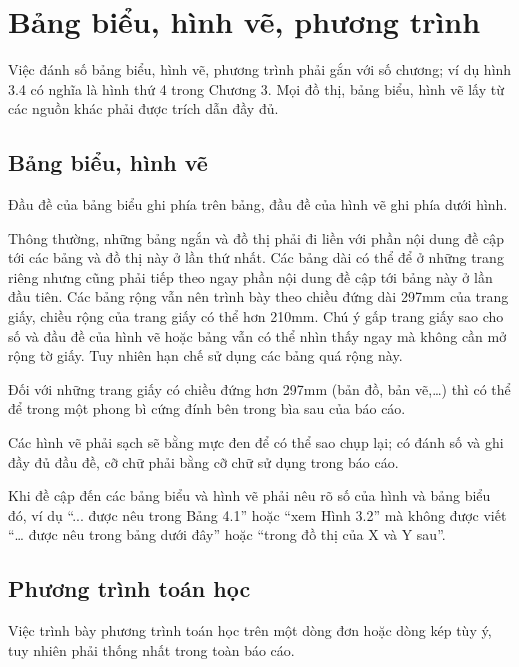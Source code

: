 \section{Bảng biểu, hình vẽ, phương trình}


Việc đánh số bảng biểu, hình vẽ, phương trình phải gắn với số chương; ví dụ hình 3.4 có nghĩa là hình thứ 4 trong Chương 3. Mọi đồ thị, bảng biểu, hình vẽ lấy từ các nguồn khác phải được trích dẫn đầy đủ.

\subsection{Bảng biểu, hình vẽ}



Đầu đề của bảng biểu ghi phía trên bảng, đầu đề của hình vẽ ghi phía dưới hình.

Thông thường, những bảng ngắn và đồ thị phải đi liền với phần nội dung đề cập tới các bảng và đồ thị này ở lần thứ nhất. Các bảng dài có thể để ở những trang riêng nhưng cũng phải tiếp theo ngay phần nội dung đề cập tới bảng này ở lần đầu tiên. Các bảng rộng vẫn nên trình bày theo chiều đứng dài 297mm của trang giấy, chiều rộng của trang giấy có thể hơn 210mm. Chú ý gấp trang giấy sao cho số và đầu đề của hình vẽ hoặc bảng vẫn có thể nhìn thấy ngay mà không cần mở rộng tờ giấy. Tuy nhiên hạn chế sử dụng các bảng quá rộng này.

Đối với những trang giấy có chiều đứng hơn 297mm (bản đồ, bản vẽ,\ldots) thì có thể để trong một phong bì cứng đính bên trong bìa sau của báo cáo.

Các hình vẽ phải sạch sẽ bằng mực đen để có thể sao chụp lại; có đánh số và ghi đầy đủ đầu đề, cỡ chữ phải bằng cỡ chữ sử dụng trong báo cáo.

Khi đề cập đến các bảng biểu và hình vẽ phải nêu rõ số của hình và bảng biểu đó, ví dụ ``... được nêu trong Bảng 4.1'' hoặc ``xem Hình 3.2'' mà không được viết ``… được nêu trong bảng dưới đây'' hoặc ``trong đồ thị của X và Y sau''.

\subsection{Phương trình toán học}

Việc trình bày phương trình toán học trên một dòng đơn hoặc dòng kép tùy ý, tuy nhiên phải thống nhất trong toàn báo cáo.


